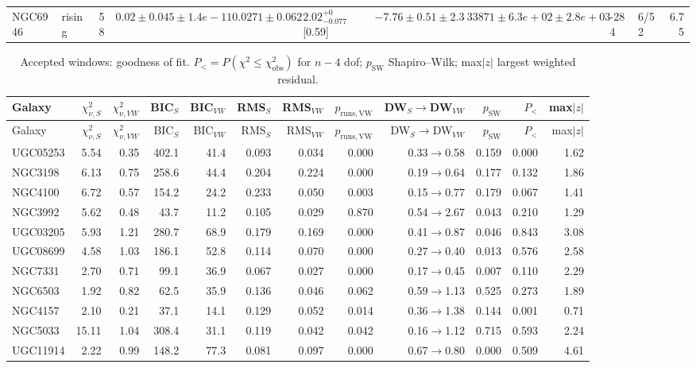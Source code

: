 \documentclass[10pt]{article}
\begin{document}
\begin{landscape}
{\begin{longtable}{llrlllllllr}
NGC6946 & rising & 58 & $0.02\pm0.045\pm1.4e-11$ & $0.0271\pm0.062$ & $2.02^{+0}_{-0.077}$ [0.59] & $-7.76\pm0.51\pm2.3$ & $33871\pm6.3e+02\pm2.8e+03$ & -284 & 6/52 & 6.75\\
\end{longtable}
\begin{longtable}{lrrrrrrrrrrr}
\caption{Accepted windows: goodness of fit. $P_<=P(\chi^2\le\chi^2_\mathrm{obs})$ for $n-4$ dof; $p_\mathrm{SW}$ Shapiro--Wilk; max$|z|$ largest weighted residual.}\\\toprule
Galaxy & $\chi^2_{\nu,S}$ & $\chi^2_{\nu,VW}$ & BIC$_S$ & BIC$_{VW}$ & RMS$_S$ & RMS$_{VW}$ & $p_\mathrm{runs,VW}$ & DW$_S\to$DW$_{VW}$ & $p_\mathrm{SW}$ & $P_<$ & max$|z|$\\\midrule\endfirsthead
\toprule Galaxy & $\chi^2_{\nu,S}$ & $\chi^2_{\nu,VW}$ & BIC$_S$ & BIC$_{VW}$ & RMS$_S$ & RMS$_{VW}$ & $p_\mathrm{runs,VW}$ & DW$_S\to$DW$_{VW}$ & $p_\mathrm{SW}$ & $P_<$ & max$|z|$\\\midrule\endhead\bottomrule\endfoot
UGC05253 & 5.54 & 0.35 & 402.1 & 41.4 & 0.093 & 0.034 & 0.000 & 0.33$\to$0.58 & 0.159 & 0.000 & 1.62\\
NGC3198 & 6.13 & 0.75 & 258.6 & 44.4 & 0.204 & 0.224 & 0.000 & 0.19$\to$0.64 & 0.177 & 0.132 & 1.86\\
NGC4100 & 6.72 & 0.57 & 154.2 & 24.2 & 0.233 & 0.050 & 0.003 & 0.15$\to$0.77 & 0.179 & 0.067 & 1.41\\
NGC3992 & 5.62 & 0.48 & 43.7 & 11.2 & 0.105 & 0.029 & 0.870 & 0.54$\to$2.67 & 0.043 & 0.210 & 1.29\\
UGC03205 & 5.93 & 1.21 & 280.7 & 68.9 & 0.179 & 0.169 & 0.000 & 0.41$\to$0.87 & 0.046 & 0.843 & 3.08\\
UGC08699 & 4.58 & 1.03 & 186.1 & 52.8 & 0.114 & 0.070 & 0.000 & 0.27$\to$0.40 & 0.013 & 0.576 & 2.58\\
NGC7331 & 2.70 & 0.71 & 99.1 & 36.9 & 0.067 & 0.027 & 0.000 & 0.17$\to$0.45 & 0.007 & 0.110 & 2.29\\
NGC6503 & 1.92 & 0.82 & 62.5 & 35.9 & 0.136 & 0.046 & 0.062 & 0.59$\to$1.13 & 0.525 & 0.273 & 1.89\\
NGC4157 & 2.10 & 0.21 & 37.1 & 14.1 & 0.129 & 0.052 & 0.014 & 0.36$\to$1.38 & 0.144 & 0.001 & 0.71\\
NGC5033 & 15.11 & 1.04 & 308.4 & 31.1 & 0.119 & 0.042 & 0.042 & 0.16$\to$1.12 & 0.715 & 0.593 & 2.24\\
UGC11914 & 2.22 & 0.99 & 148.2 & 77.3 & 0.081 & 0.097 & 0.000 & 0.67$\to$0.80 & 0.000 & 0.509 & 4.61\\

\end{longtable}}
\end{landscape}
\end{document}
